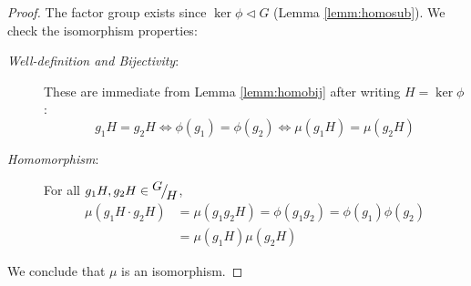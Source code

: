 \begin{proof}
The factor group exists since $\ker\phi\triangleleft G$ (Lemma \ref{lemm:homosub}). We check the isomorphism properties:
  \begin{description}
		\item[\normalfont\emph{Well-definition and Bijectivity}:] These are immediate from Lemma \ref{lemm:homobij} after writing $H=\ker\phi$:
		\[g_1H=g_2H\iff \phi(g_1)=\phi(g_2)\iff \mu(g_1H)=\mu(g_2H)\]
		\item[\normalfont\emph{Homomorphism}:] For all $g_1H,g_2H\in{}^{\textstyle {G}}\!\big/_{\textstyle \!{H}}$,
		\begin{align*}
		\mu(g_1H\cdot g_2H)&=\mu(g_1g_2H)=\phi(g_1g_2) =\phi(g_1)\phi(g_2)\tag{$\phi$ is a homomorphism}\\
		&=\mu(g_1H)\mu(g_2H)
		\end{align*}
  \end{description}
We conclude that $\mu$ is an isomorphism.
\end{proof}

